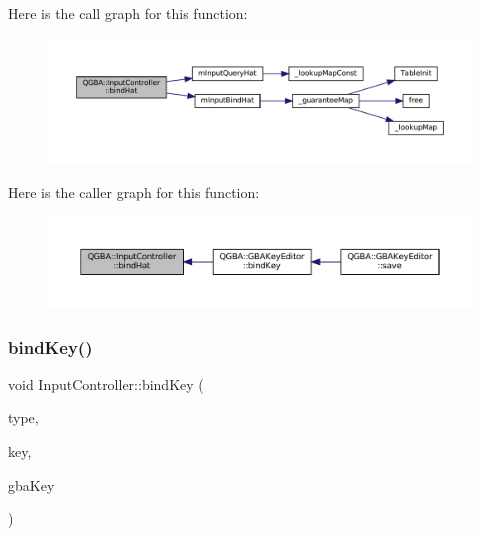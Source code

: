 Here is the call graph for this function\+:
\nopagebreak
\begin{figure}[H]
\begin{center}
\leavevmode
\includegraphics[width=350pt]{class_q_g_b_a_1_1_input_controller_a213ad91873af6067f50e5581e1d9b46c_cgraph}
\end{center}
\end{figure}
Here is the caller graph for this function\+:
\nopagebreak
\begin{figure}[H]
\begin{center}
\leavevmode
\includegraphics[width=350pt]{class_q_g_b_a_1_1_input_controller_a213ad91873af6067f50e5581e1d9b46c_icgraph}
\end{center}
\end{figure}
\mbox{\label{class_q_g_b_a_1_1_input_controller_ac603f8f09a8a04ed84dbec5dfcc3db56}} 
\subsubsection{\texorpdfstring{bind\+Key()}{bindKey()}}
{\footnotesize\ttfamily void Input\+Controller\+::bind\+Key (\begin{DoxyParamCaption}\item[{uint32\+\_\+t}]{type,  }\item[{\mbox{\hyperlink{ioapi_8h_a787fa3cf048117ba7123753c1e74fcd6}{int}}}]{key,  }\item[{G\+B\+A\+Key}]{gba\+Key }\end{DoxyParamCaption})}

